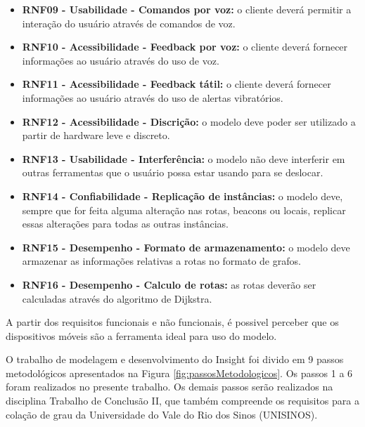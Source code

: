 \documentclass[english,brazilian]{UNISINOSmonografia}
\begin{document}
\begin{itemize}
	\item \textbf{RNF09 - Usabilidade - Comandos por voz:} o cliente deverá permitir a interação do usuário através de comandos de voz.

	\item \textbf{RNF10 - Acessibilidade - Feedback por voz:} o cliente deverá fornecer informações ao usuário através do uso de voz.

	\item \textbf{RNF11 - Acessibilidade - Feedback tátil:} o cliente deverá fornecer informações ao usuário através do uso de alertas vibratórios.

	\item \textbf{RNF12 - Acessibilidade - Discrição:} o modelo deve poder ser utilizado a partir de hardware leve e discreto.

	\item \textbf{RNF13 - Usabilidade - Interferência:} o modelo não deve interferir em outras ferramentas que o usuário possa estar usando para se deslocar.

	\item \textbf{RNF14 - Confiabilidade - Replicação de instâncias:} o modelo deve, sempre que for feita alguma alteração nas rotas, beacons ou locais, replicar essas alterações para todas as outras instâncias.

	\item \textbf{RNF15 - Desempenho - Formato de armazenamento:} o modelo deve armazenar as informações relativas a rotas no formato de grafos.

	\item \textbf{RNF16 - Desempenho - Calculo de rotas:} as rotas deverão ser calculadas através do algoritmo de Dijkstra.

\end{itemize}

A partir dos requisitos funcionais e não funcionais, é possivel perceber que os dispositivos móveis são a ferramenta ideal para uso do modelo.

O trabalho de modelagem e desenvolvimento do Insight foi divido em 9 passos metodológicos apresentados na Figura \ref{fig:passosMetodologicos}. Os passos 1 a 6 foram realizados no presente trabalho. Os demais passos serão realizados na disciplina Trabalho de Conclusão II, que também compreende os requisitos para a colação de grau da Universidade do Vale do Rio dos Sinos (UNISINOS).
\end{document}
